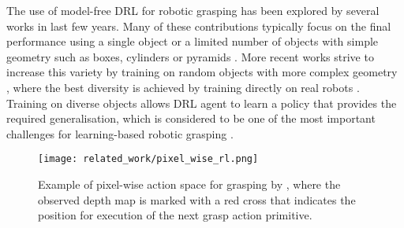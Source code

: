 The use of model-free DRL for robotic grasping has been explored by several works in last few years. Many of these contributions typically focus on the final performance using a single object \cite{popov_data-efficient_2017, haarnoja_composable_2018, zhan_framework_2020} or a limited number of objects with simple geometry such as boxes, cylinders or pyramids \cite{tobin_domain_2017, gualtieri_pick_2018, gualtieri_learning_2018, zeng_learning_2018, liu_active_2019, joshi_robotic_2020, daniel_deep_2020, iqbal_toward_2020}. More recent works strive to increase this variety by training on random objects with more complex geometry \cite{quillen_deep_2018, breyer_comparing_2019, wu_generative_2020, kim_acceleration_2020}, where the best diversity is achieved by training directly on real robots \cite{kalashnikov_qt-opt_2018}. Training on diverse objects allows DRL agent to learn a policy that provides the required generalisation, which is considered to be one of the most important challenges for learning-based robotic grasping \cite{quillen_deep_2018}.

\begin{figure}[b]
    \centering
    \texttt{[image: related\_work/pixel\_wise\_rl.png]}
    \caption{Example of pixel-wise action space for grasping by \protect\citet{gualtieri_learning_2018}, where the observed depth map is marked with a red cross that indicates the position for execution of the next grasp action primitive.}
    \label{fig:rw_pixel_wise_rl}
\end{figure}

